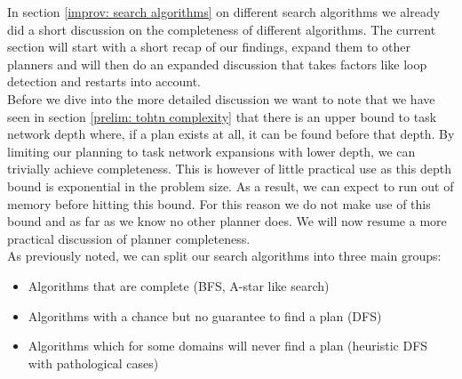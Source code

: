 In section \ref{improv: search algorithms} on different search algorithms we already did a short discussion on the completeness of different algorithms. The current section will start with a short recap of our findings, expand them to other planners and will then do an expanded discussion that takes factors like loop detection and restarts into account. \\
Before we dive into the more detailed discussion we want to note that we have seen in section \ref{prelim: tohtn complexity} that there is an upper bound to task network depth where, if a plan exists at all, it can be found before that depth. By limiting our planning to task network expansions with lower depth, we can trivially achieve completeness. This is however of little practical use as this depth bound is exponential in the problem size. As a result, we can expect to run out of memory before hitting this bound. For this reason we do not make use of this bound and as far as we know no other planner does. We will now resume a more practical discussion of planner completeness.\\ 
As previously noted, we can split our search algorithms into three main groups:
\begin{itemize}
	\item Algorithms that are complete (BFS, A-star like search)
	\item Algorithms with a chance but no guarantee to find a plan (DFS)
	\item Algorithms which for some domains will never find a plan (heuristic DFS with pathological cases)
\end{itemize}
